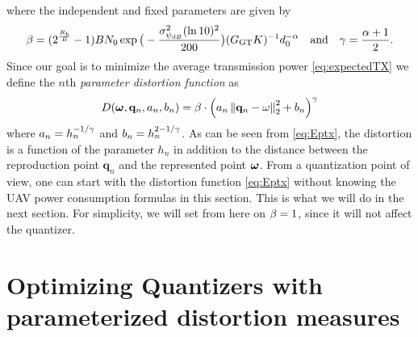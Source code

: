 \documentclass[smallabstract,smallcaptions]{dccpaper}
\renewcommand{\vp}{\mathbf q}
\newcommand{\Rb}{\ensuremath{R_b}}         %
\newcommand{\GGT}{\ensuremath{G_{\text{GT}}}}         %
\begin{document}
%
where the independent and fixed parameters are given by
%
\begin{align}
  \bet=(2^{\frac{\Rb}{B}}-1)B N_0 \exp\big(-\frac{\sig_{\psi_{dB}}^2 (\ln 10)^2}{200}\big)(\GGT K)^{-1}
  d_0^{-\alp}\quad\text{and}\quad
  \gam=\frac{\alp+1}{2}.
\end{align}
%
Since our goal is to minimize the average transmission power \eqref{eq:expectedTX} we define 
the $n$th \emph{parameter distortion function} as
%
\begin{align}
  D(\vome,\vp_n,a_n,b_n)=\bet\cdot  \left(a_n\Norm{\vp_n-\ome}_2^2+b_n\right)^\gam
  \label{eq:Eptx}
\end{align}
%
where $a_n=h_n^{-1/\gamma}$ and $b_n=h_n^{2-1/\gamma}$.  As can be seen from \eqref{eq:Eptx}, the distortion is a function
of the parameter $h_n$ in addition to the distance between the reproduction point $\vp_n$ and the represented point
$\boldsymbol{ \omega}$. From a quantization point of view, one can start with the distortion function \eqref{eq:Eptx} without knowing the UAV
power consumption formulas in this section. This is what we will do in the next section.  For simplicity, we will set
from here on $\beta=1$, since it will not affect the quantizer. 


\section{Optimizing Quantizers with parameterized distortion measures}\label{sec:optmize1D}
\end{document}
